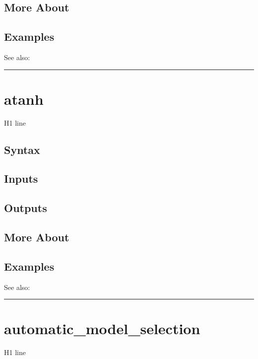\documentclass[letterpaper,10pt,english]{sphinxmanual}
\begin{document}
\subsection{More About}
\label{classes/time_series/@ts/ts:id63}

\subsection{Examples}
\label{classes/time_series/@ts/ts:id64}
See also:


\bigskip\hrule{}\bigskip



\section{atanh}
\label{classes/time_series/@ts/ts:id65}\label{classes/time_series/@ts/ts:atanh}
H1 line


\subsection{Syntax}
\label{classes/time_series/@ts/ts:id66}

\subsection{Inputs}
\label{classes/time_series/@ts/ts:id67}

\subsection{Outputs}
\label{classes/time_series/@ts/ts:id68}

\subsection{More About}
\label{classes/time_series/@ts/ts:id69}

\subsection{Examples}
\label{classes/time_series/@ts/ts:id70}
See also:


\bigskip\hrule{}\bigskip



\section{automatic\_model\_selection}
\label{classes/time_series/@ts/ts:id71}\label{classes/time_series/@ts/ts:automatic-model-selection}
H1 line
\end{document}
